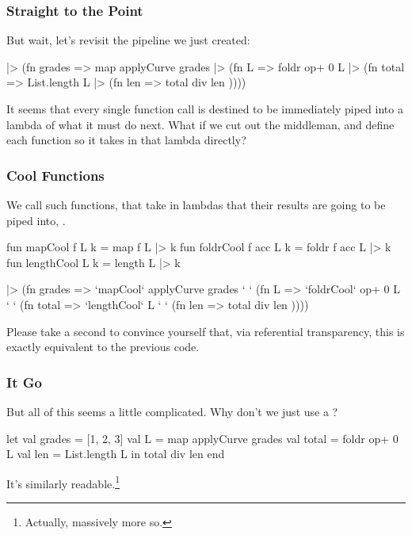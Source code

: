 \documentclass[aspectratio=169]{beamer}
\begin{document}
\begin{frame}[fragile]
  \frametitle{Straight to the Point}

  But wait, let's revisit the pipeline we just created:

  \begin{codeblock}
    [1, 2, 3]             |> (fn grades =>
    map applyCurve grades |> (fn L =>
    foldr op+ 0 L         |> (fn total =>
    List.length L         |> (fn len =>
    total div len         ))))
  \end{codeblock}

  \pause
  \vspace{\fill}

  It seems that every single function call is destined to be immediately
  piped into a lambda of what it must do next. What if we cut out
  the middleman, and define each function so it takes in that lambda directly?
\end{frame}

\begin{frame}[fragile]
  \frametitle{Cool Functions}

  We call such functions, that take in lambdas that their results are going
  to be piped into, .

  \begin{codeblock}
    fun mapCool f L k       = map f L |> k
    fun foldrCool f acc L k = foldr f acc L |> k
    fun lengthCool L k      = length L |> k
  \end{codeblock}

  \begin{codeblock}
    [1, 2, 3]                  |> (fn grades =>
    `mapCool` applyCurve grades  `  ` (fn L =>
    `foldrCool` op+ 0 L          `  ` (fn total =>
    `lengthCool` L               `  ` (fn len =>
    total div len                ))))
  \end{codeblock}

  Please take a second to convince yourself that, via referential transparency,
  this is exactly equivalent to the previous code.
\end{frame}



\begin{frame}[fragile]
  \frametitle{ It Go}

  But all of this seems a little complicated. Why don't we just use a ?

  \pause
  \begin{codeblock}
    let
      val grades = [1, 2, 3]
      val L      = map applyCurve grades
      val total  = foldr op+ 0 L
      val len    = List.length L
    in
      total div len
    end
  \end{codeblock}

  \pause
  \vspace{\fill}

  It's similarly readable.\footnote{Actually, massively more so.}
\end{frame}
\end{document}
